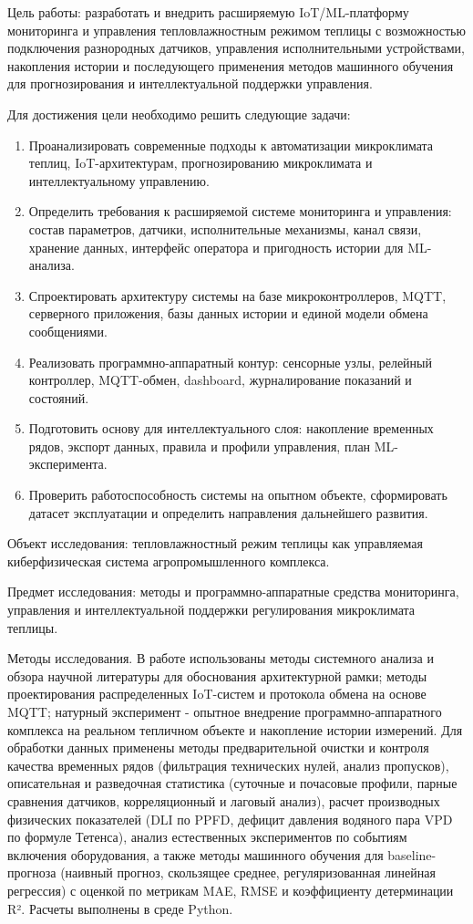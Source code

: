 \documentclass[a4paper,14pt]{extarticle}
\providecommand{\tightlist}{%
  \setlength{\itemsep}{0pt}\setlength{\parskip}{0pt}}
\begin{document}
Цель работы: разработать и внедрить расширяемую IoT/ML-платформу
мониторинга и управления тепловлажностным режимом теплицы с возможностью
подключения разнородных датчиков, управления исполнительными
устройствами, накопления истории и последующего применения методов
машинного обучения для прогнозирования и интеллектуальной поддержки
управления.

Для достижения цели необходимо решить следующие задачи:

\begin{enumerate}
\def\labelenumi{\arabic{enumi})}
\tightlist
\item
  Проанализировать современные подходы к автоматизации микроклимата
  теплиц, IoT-архитектурам, прогнозированию микроклимата и
  интеллектуальному управлению.
\item
  Определить требования к расширяемой системе мониторинга и управления:
  состав параметров, датчики, исполнительные механизмы, канал связи,
  хранение данных, интерфейс оператора и пригодность истории для
  ML-анализа.
\item
  Спроектировать архитектуру системы на базе микроконтроллеров, MQTT,
  серверного приложения, базы данных истории и единой модели обмена
  сообщениями.
\item
  Реализовать программно-аппаратный контур: сенсорные узлы, релейный
  контроллер, MQTT-обмен, dashboard, журналирование показаний и
  состояний.
\item
  Подготовить основу для интеллектуального слоя: накопление временных
  рядов, экспорт данных, правила и профили управления, план
  ML-эксперимента.
\item
  Проверить работоспособность системы на опытном объекте, сформировать
  датасет эксплуатации и определить направления дальнейшего развития.
\end{enumerate}

Объект исследования: тепловлажностный режим теплицы как управляемая
киберфизическая система агропромышленного комплекса.

Предмет исследования: методы и программно-аппаратные средства
мониторинга, управления и интеллектуальной поддержки регулирования
микроклимата теплицы.

Методы исследования. В работе использованы методы системного анализа и
обзора научной литературы для обоснования архитектурной рамки; методы
проектирования распределенных IoT-систем и протокола обмена на основе
MQTT; натурный эксперимент - опытное внедрение программно-аппаратного
комплекса на реальном тепличном объекте и накопление истории измерений.
Для обработки данных применены методы предварительной очистки и контроля
качества временных рядов (фильтрация технических нулей, анализ
пропусков), описательная и разведочная статистика (суточные и почасовые
профили, парные сравнения датчиков, корреляционный и лаговый анализ),
расчет производных физических показателей (DLI по PPFD, дефицит давления
водяного пара VPD по формуле Тетенса), анализ естественных экспериментов
по событиям включения оборудования, а также методы машинного обучения
для baseline-прогноза (наивный прогноз, скользящее среднее,
регуляризованная линейная регрессия) с оценкой по метрикам MAE, RMSE и
коэффициенту детерминации R². Расчеты выполнены в среде Python.
\end{document}
